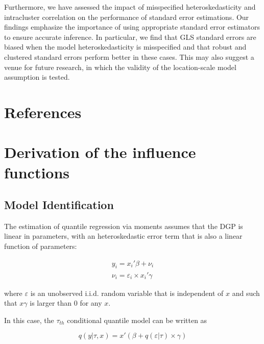 \documentclass[
  authoryear,
  review,
  1p]{elsarticle}
\begin{document}
Furthermore, we have assessed the impact of misspecified
heteroskedasticity and intracluster correlation on the performance of
standard error estimations. Our findings emphasize the importance of
using appropriate standard error estimators to ensure accurate
inference. In particular, we find that GLS standard errors are biased
when the model heteroskedasticity is misspecified and that robust and
clustered standard errors perform better in these cases. This may also
suggest a venue for future research, in which the validity of the
location-scale model assumption is tested.

\hypertarget{references}{%
\section*{References}\label{references}}

\renewcommand{\bibsection}{}


\newpage{}

\appendix

\hypertarget{derivation-of-the-influence-functions}{%
\section{Derivation of the influence
functions}\label{derivation-of-the-influence-functions}}

\hypertarget{model-identification}{%
\subsection{Model Identification}\label{model-identification}}

The estimation of quantile regression via moments assumes that the DGP
is linear in parameters, with an heteroskedastic error term that is also
a linear function of parameters:

\[\begin{aligned}
y_i = x_i'\beta + \nu_i \\
\nu_i = \varepsilon_i \times x_i'\gamma
\end{aligned}
\]

where \(\varepsilon\) is an unobserved i.i.d. random variable that is
independent of \(x\) and such that \(x\gamma\) is larger than 0 for any
\(x\).

In this case, the \(\tau_{th}\) conditional quantile model can be
written as

\[q(y | \tau, x) = x'(\beta + q(\varepsilon | \tau) \times \gamma)\]
\end{document}
